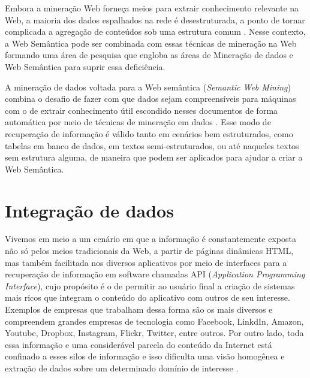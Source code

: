 Embora a mineração Web forneça meios para extrair conhecimento relevante na Web, a maioria dos dados espalhados na rede é desestruturada, a ponto de tornar complicada a agregação de conteúdos sob uma estrutura comum \citep{Kabir2014}. Nesse contexto, a Web Semântica pode ser combinada com essas técnicas de mineração na Web formando uma área de pesquisa que engloba as áreas de Mineração de dados e Web Semântica para suprir essa deficiência.

A mineração de dados voltada para a Web semântica (\emph{Semantic Web Mining}) combina o desafio de fazer com que dados sejam compreensíveis para máquinas com o de extrair conhecimento útil escondido nesses documentos de forma automática por meio de técnicas de mineração em dados \citep{Stumme2006}. Esse modo de recuperação de informação é válido tanto em cenários bem estruturados, como tabelas em banco de dados, em textos semi-estruturados, ou até naqueles textos sem estrutura alguma, de maneira que podem ser aplicados para ajudar a criar a Web Semântica.

\section{Integração de dados}
\label{sec:integracao}

Vivemos em meio a um cenário em que a informação é constantemente exposta não só pelos meios tradicionais da Web, a partir de páginas dinâmicas HTML, mas também facilitada nos diversos aplicativos por meio de interfaces para a recuperação de informação em software chamadas API (\emph{Application Programming Interface}), cujo  propósito é o de permitir ao usuário final a criação de sistemas mais ricos que integram o conteúdo do aplicativo com outros de seu interesse. Exemplos de empresas que trabalham dessa forma são os mais diversos e compreendem grandes empresas de tecnologia como Facebook, LinkdIn, Amazon, Youtube, Dropbox, Instagram, Flickr, Twitter, entre outros. Por outro lado, toda essa informação e uma considerável parcela do conteúdo da Internet está confinado a esses silos de informação e isso dificulta uma visão homogênea e extração de dados sobre um determinado domínio de interesse \citep{Heath2008, Civili2013}. 

